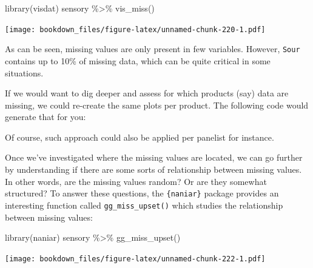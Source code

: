 \documentclass[
]{krantz}
\makeatletter
\newenvironment{Shaded}{\begin{snugshade}}{\end{snugshade}}
\newcommand{\ControlFlowTok}[1]{\textcolor[rgb]{0.27,0.27,0.27}{\textbf{#1}}}
\newcommand{\FunctionTok}[1]{\textcolor[rgb]{0,0,0}{#1}}
\newcommand{\NormalTok}[1]{#1}
\newcommand{\SpecialCharTok}[1]{\textcolor[rgb]{0,0,0}{#1}}
\newenvironment{kframe}{%
\medskip{}
\setlength{\fboxsep}{.8em}
 \def\at@end@of@kframe{}%
 \ifinner\ifhmode%
  \def\at@end@of@kframe{\end{minipage}}%
  \begin{minipage}{\columnwidth}%
 \fi\fi%
 \def\FrameCommand##1{\hskip\@totalleftmargin \hskip-\fboxsep
 \colorbox{shadecolor}{##1}\hskip-\fboxsep
     \hskip-\linewidth \hskip-\@totalleftmargin \hskip\columnwidth}%
 \MakeFramed {\advance\hsize-\width
   \@totalleftmargin\z@ \linewidth\hsize
   \@setminipage}}%
 {\par\unskip\endMakeFramed%
 \at@end@of@kframe}
\renewenvironment{Shaded}{\begin{kframe}}{\end{kframe}}
\makeatother
\begin{document}
\begin{Shaded}
\begin{Highlighting}[]
\FunctionTok{library}\NormalTok{(visdat)}
\NormalTok{sensory }\SpecialCharTok{\%\textgreater{}\%} 
  \FunctionTok{vis\_miss}\NormalTok{()}
\end{Highlighting}
\end{Shaded}

\texttt{[image: bookdown\_files/figure-latex/unnamed-chunk-220-1.pdf]}

As can be seen, missing values are only present in few variables. However, \texttt{Sour} contains up to 10\% of missing data, which can be quite critical in some situations.

If we would want to dig deeper and assess for which products (say) data are missing, we could re-create the same plots per product. The following code would generate that for you:

\begin{Shaded}
\end{Shaded}

Of course, such approach could also be applied per panelist for instance.

Once we've investigated where the missing values are located, we can go further by understanding if there are some sorts of relationship between missing values. In other words, are the missing values random? Or are they somewhat structured?
To answer these questions, the \texttt{\{naniar\}} package provides an interesting function called \texttt{gg\_miss\_upset()} which studies the relationship between missing values:

\begin{Shaded}
\begin{Highlighting}[]
\FunctionTok{library}\NormalTok{(naniar)}
\NormalTok{sensory }\SpecialCharTok{\%\textgreater{}\%}
  \FunctionTok{gg\_miss\_upset}\NormalTok{()}
\end{Highlighting}
\end{Shaded}

\texttt{[image: bookdown\_files/figure-latex/unnamed-chunk-222-1.pdf]}
\end{document}
